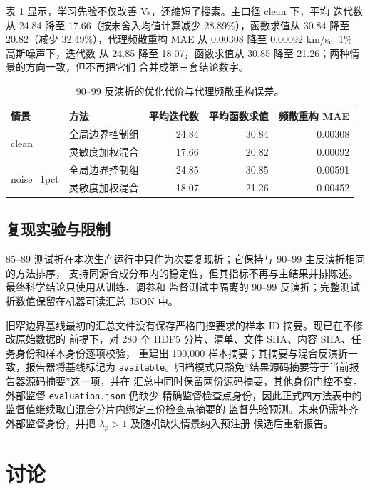 \documentclass[UTF8,a4paper,11pt]{ctexart}
\begin{document}
表 \ref{tab:hybrid-cost} 显示，学习先验不仅改善 Vs，还缩短了搜索。主口径 clean 下，平均
迭代数从 24.84 降至 17.66（按未舍入均值计算减少 28.89\%），函数求值从 30.84 降至 20.82（减少
32.49\%），代理频散重构 MAE 从 0.00308 降至 0.00092 km/s。1\% 高斯噪声下，迭代数
从 24.85 降至 18.07，函数求值从 30.85 降至 21.26；两种情景的方向一致，但不再把它们
合并成第三套结论数字。

\begin{table}[H]
\centering
\caption{90--99 反演折的优化代价与代理频散重构误差。}
\label{tab:hybrid-cost}
\small
\begin{tabular}{llrrr}
\toprule
情景 & 方法 & 平均迭代数 & 平均函数求值 & 频散重构 MAE \\
\midrule
\multirow{2}{*}{clean}
 & 全局边界控制组 & 24.84 & 30.84 & 0.00308 \\
 & 灵敏度加权混合 & 17.66 & 20.82 & 0.00092 \\
\midrule
\multirow{2}{*}{noise\_1pct}
 & 全局边界控制组 & 24.85 & 30.85 & 0.00591 \\
 & 灵敏度加权混合 & 18.07 & 21.26 & 0.00452 \\
\bottomrule
\end{tabular}
\end{table}

\subsection{复现实验与限制}

85--89 测试折在本次生产运行中只作为次要复现折；它保持与 90--99 主反演折相同的方法排序，
支持同源合成分布内的稳定性，但其指标不再与主结果并排陈述。最终科学结论只使用从训练、调参和
监督测试中隔离的 90--99 反演折；完整测试折数值保留在机器可读汇总 JSON 中。

旧窄边界基线最初的汇总文件没有保存严格门控要求的样本 ID 摘要。现已在不修改原始数据的
前提下，对 280 个 HDF5 分片、清单、文件 SHA、内容 SHA、任务身份和样本身份逐项校验，
重建出 100{,}000 样本摘要；其摘要与混合反演折一致，报告器将基线标记为
\texttt{available}。归档模式只豁免``结果源码摘要等于当前报告器源码摘要''这一项，并在
汇总中同时保留两份源码摘要，其他身份门控不变。外部监督 \texttt{evaluation.json} 仍缺少
精确监督检查点身份，因此正式四方法表中的监督值继续取自混合分片内绑定三份检查点摘要的
监督先验预测。未来仍需补齐外部监督身份，并把 \(\lambda_p>1\) 及随机缺失情景纳入预注册
候选后重新报告。

\section{讨论}\label{sec:discussion}
\end{document}
